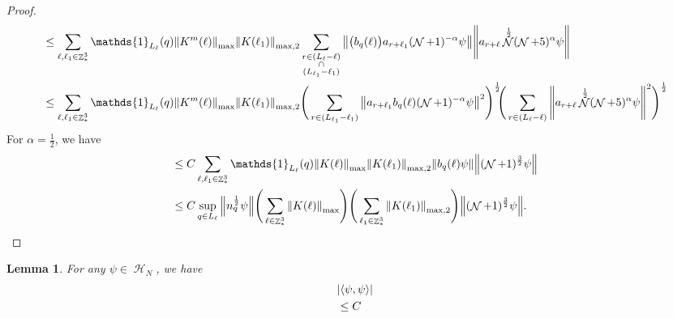 \documentclass[sn-mathphys, Numbered ,a4paper]{sn-jnl}%
\DeclareMathOperator{\Z}{\mathbb{Z}}
\DeclareMathOperator{\HH}{\mathcal{H}}
\DeclareMathOperator{\NN}{\mathcal{N}}
\newcommand{\half}{\frac{1}{2}}
\newcommand{\eva}[1]{\left\langle #1 \right\rangle}
\theoremstyle{plain}
\newtheorem{lemma}[theorem]{Lemma}
\theoremstyle{definition}
\theoremstyle{remark}
\theoremstyle{plain}
\theoremstyle{definition}
\theoremstyle{remark}
\begin{document}
\begin{proof}
\begin{align}
		&\leq \sum\limits_{\ell,\ell_1 \in \Z^3_*} \mathds{1}_{L_\ell}(q) \norm{K^{m}(\ell)}_{\mathrm{max}}\norm{K(\ell_1)}_{\mathrm{max},2} \sum\limits_{\substack{r \in (L_\ell-\ell) \\ \cap \\ (L_{\ell_1}-\ell_1)}} \norm{\big(b_{q}(\ell)\big) a_{r+\ell_1} (\NN+1)^{-\alpha} \psi} \norm { a_{r+\ell}\NN^\half (\NN+5)^{\alpha} \psi }\nonumber\\
		&\leq \sum\limits_{\ell,\ell_1 \in \Z^3_*} \mathds{1}_{L_\ell}(q) \norm{K^{m}(\ell)}_{\mathrm{max}}\norm{K(\ell_1)}_{\mathrm{max},2} \Bigg(\sum\limits_{r \in (L_{\ell_1}-\ell_1)} \norm{ a_{r+\ell_1}b_{q}(\ell) (\NN+1)^{-\alpha} \psi}^2\Bigg)^\half\!\!\Bigg( \sum\limits_{r \in (L_\ell-\ell)} \norm { a_{r+\ell}\NN^\half (\NN+5)^{\alpha} \psi }^2\Bigg)^\half\nonumber\\
	\end{align}
	For $\alpha = \half$, we have
	\begin{align}
		&\leq C\sum\limits_{\ell,\ell_1 \in \Z^3_*} \mathds{1}_{L_\ell}(q) \norm{K(\ell)}_{\mathrm{max}}\norm{K(\ell_1)}_{\mathrm{max},2}  \norm{b_{q}(\ell) \psi} \norm { (\NN+1)^{\frac{3}{2}} \psi }\nonumber\\
		&\leq C \sup\limits_{q \in L_\ell} \norm{n_{q}^{\half} \psi} \Bigg(\sum\limits_{\ell \in \Z^3_*} \norm{K(\ell)}_{\mathrm{max}}\Bigg)\Bigg( \sum\limits_{\ell_1 \in \Z^3_*}\norm{K(\ell_1)}_{\mathrm{max},2} \Bigg)  \norm { (\NN+1)^{\frac{3}{2}} \psi }. \label{eq:preleadbosest}
	\end{align}
\end{proof}

\begin{lemma}
	For any $\psi \in \HH_N$, we have
	\begin{align}
		&\abs{\eva{\psi,   \psi}}\nonumber\\&\leq C
	\end{align}
\end{lemma}
\end{document}
